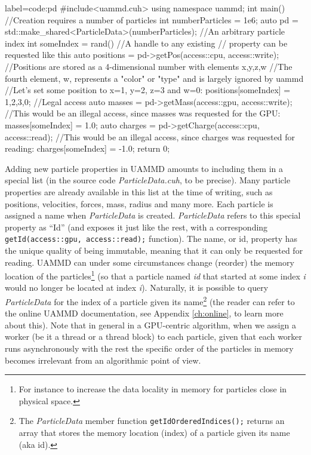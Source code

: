 \documentclass[twoside,openright,titlepage,numbers=noenddot,%
headinclude,footinclude,cleardoublepage=empty,abstract=on,
BCOR=5mm,fontsize=11pt, dvipsnames, paper=b5
]{scrreprt}
\def\ucpp{uammd_cpp_lexer.py:UAMMDCppLexer -x}
\newcommand{\uammd}{\gls{UAMMD}\xspace}
\begin{document}
\begin{code2}
  {label=code:pd}
#include<uammd.cuh>
using namespace uammd; 
int main(){
  //Creation requires a number of particles
  int numberParticles = 1e6;
  auto pd = std::make_shared<ParticleData>(numberParticles);
  //An arbitrary particle index
  int someIndex = rand()%
  //A handle to any existing 
  // property can be requested like this
  auto positions = pd->getPos(access::cpu, access::write);
  //Positions are stored as a 4-dimensional number with elements x,y,z,w
  //The fourth element, w, represents a "color" or "type" and is largely ignored by uammd
  //Let's set some position to x=1, y=2, z=3 and w=0:
  positions[someIndex] = {1,2,3,0}; //Legal access
  auto masses = pd->getMass(access::gpu, access::write);
  //This would be an illegal access, since masses was requested for the GPU:
  masses[someIndex] = 1.0;
  auto charges = pd->getCharge(access::cpu, access::read);
  //This would be an illegal access, since charges was requested for reading:
  charges[someIndex] = -1.0;
  return 0;
}
\end{code2}
Adding new particle properties in \uammd amounts to including them in a special list (in the source code \emph{ParticleData.cuh}, to be precise). Many particle properties are already available in this list at the time of writing, such as positions, velocities, forces, mass, radius and many more. Each particle is assigned a name when \emph{ParticleData} is created. \emph{ParticleData} refers to this special property as ``Id'' (and exposes it just like the rest, with a corresponding \texttt{getId(access::gpu, access::read);} function). The name, or id, property has the unique quality of being immutable, meaning that it can only be requested for reading. \uammd can under some circumstances change (reorder) the memory location of the particles\footnote{For instance to increase the data locality in memory for particles close in physical space.} (so that a particle named \emph{id} that started at some index \emph{i} would no longer be located at index \emph{i}). Naturally, it is possible to query \emph{ParticleData} for the index of a particle given its name\footnote{The \emph{ParticleData} member function \texttt{getIdOrderedIndices();} returns an array that stores the memory location (index) of a particle given its name (aka id).} (the reader can refer to the online \uammd documentation, see Appendix \ref{ch:online}, to learn more about this). Note that in general in a GPU-centric algorithm, when we assign a worker (be it a thread or a thread block) to each particle, given that each worker runs asynchronously with the rest the specific order of the particles in memory becomes irrelevant from an algorithmic point of view.
\end{document}

